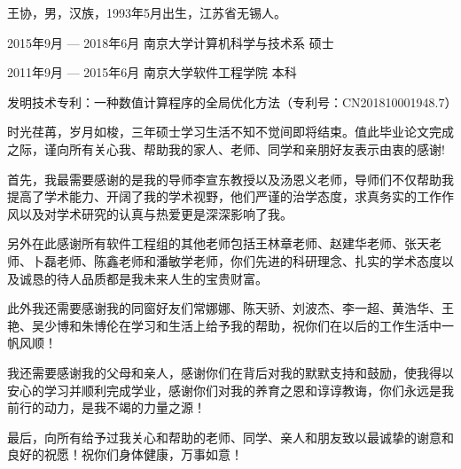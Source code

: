\documentclass[master,macfonts]{njuthesis}
\begin{document}
\backmatter
\begin{resume}
\begin{authorinfo}
\noindent 王协，男，汉族，1993年5月出生，江苏省无锡人。
\end{authorinfo}
\begin{education}
\item[2015年9月 --- 2018年6月] 南京大学计算机科学与技术系 \hfill 硕士
\item[2011年9月 --- 2015年6月] 南京大学软件工程学院 \hfill 本科
\end{education}
\begin{publications}
\item 发明技术专利：一种数值计算程序的全局优化方法（专利号：CN201810001948.7）
\end{publications}
\end{resume}

\begin{acknowledgement}

时光荏苒，岁月如梭，三年硕士学习生活不知不觉间即将结束。值此毕业论文完成之际，谨向所有关心我、帮助我的家人、老师、同学和亲朋好友表示由衷的感谢!

首先，我最需要感谢的是我的导师李宣东教授以及汤恩义老师，导师们不仅帮助我提高了学术能力、开阔了我的学术视野，他们严谨的治学态度，求真务实的工作作风以及对学术研究的认真与热爱更是深深影响了我。

另外在此感谢所有软件工程组的其他老师包括王林章老师、赵建华老师、张天老师、卜磊老师、陈鑫老师和潘敏学老师，你们先进的科研理念、扎实的学术态度以及诚恳的待人品质都是我未来人生的宝贵财富。

此外我还需要感谢我的同窗好友们常娜娜、陈天骄、刘波杰、李一超、黄浩华、王艳、吴少博和朱博伦在学习和生活上给予我的帮助，祝你们在以后的工作生活中一帆风顺！

我还需要感谢我的父母和亲人，感谢你们在背后对我的默默支持和鼓励，使我得以安心的学习并顺利完成学业，感谢你们对我的养育之恩和谆谆教诲，你们永远是我前行的动力，是我不竭的力量之源！

最后，向所有给予过我关心和帮助的老师、同学、亲人和朋友致以最诚挚的谢意和良好的祝愿！祝你们身体健康，万事如意！

\end{acknowledgement}


\makelicense

\end{document}
